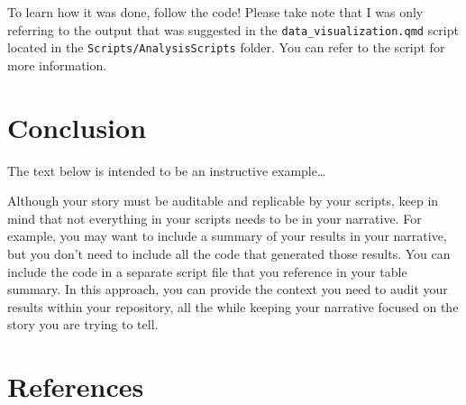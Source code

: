 \documentclass[
  a4paper,
]{article}
\begin{document}
\begin{longtable}[]
\end{longtable}

To learn how it was done, follow the code! Please take note that I was
only referring to the output that was suggested in the
\texttt{data\_visualization.qmd} script located in the
\texttt{Scripts/AnalysisScripts} folder. You can refer to the script for
more information.


\section{Conclusion}\label{conclusion}

The text below is intended to be an instructive example\ldots{}

Although your story must be auditable and replicable by your scripts,
keep in mind that not everything in your scripts needs to be in your
narrative. For example, you may want to include a summary of your
results in your narrative, but you don't need to include all the code
that generated those results. You can include the code in a separate
script file that you reference in your table summary. In this approach,
you can provide the context you need to audit your results within your
repository, all the while keeping your narrative focused on the story
you are trying to tell.


\section*{References}\label{references}

\end{document}
